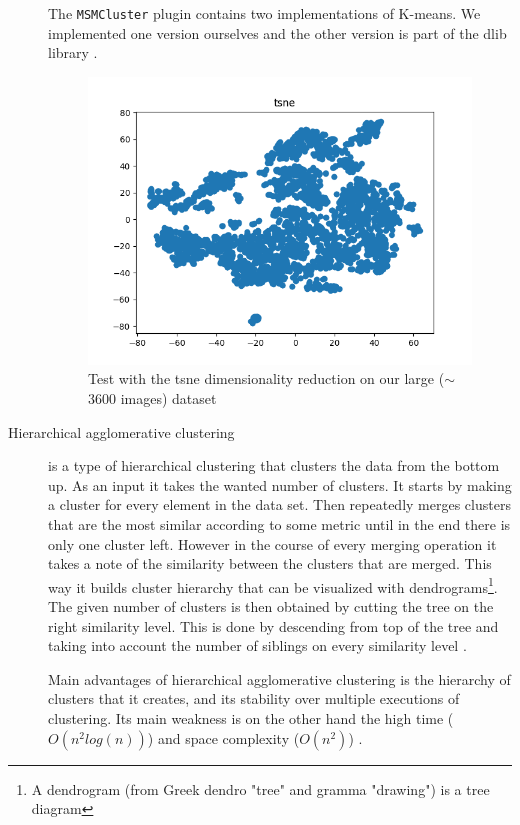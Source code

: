 \documentclass[journal]{vgtc}       %
\begin{document}
\begin{description}
The \verb|MSMCluster| plugin contains two implementations of K-means. We implemented one version ourselves and the other version is part of the dlib library \cite{dlib09}.

\begin{figure}[t]
	\begin{center}
		\includegraphics[width=.75\linewidth]{tsneFull.png}
	\end{center}
	\caption{\label{fig:tsnef} Test with the tsne dimensionality reduction on our large ($\sim$ 3600 images) dataset}
\end{figure}

\item [Hierarchical agglomerative clustering] is a type of hierarchical clustering that clusters the data from the bottom up. As an input it takes the wanted number of clusters. It starts by making a cluster for every element in the data set. Then repeatedly merges clusters that are the most similar according to some metric until in the end there is only one cluster left. However in the course of every merging operation it takes a note of the similarity between the clusters that are merged. This way it builds cluster hierarchy that can be visualized with dendrograms\footnote{A dendrogram (from Greek dendro "tree" and gramma "drawing") is a tree diagram}. The given number of clusters is then obtained by cutting the tree on the right similarity level. This is done by descending from top of the tree and taking into account the number of siblings on every similarity level \cite{iir}.

Main advantages of hierarchical agglomerative clustering is the hierarchy of clusters that it creates, and its stability over multiple executions of clustering. Its main weakness is on the other hand the high time ($O(n^2 log(n))$) and space complexity ($O(n^2)$) \cite{jain1999data}.


\end{description}
\end{document}
